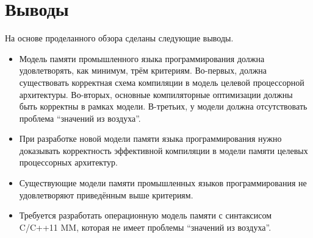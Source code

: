 
\section{Выводы}
На основе проделанного обзора сделаны следующие выводы.
\begin{itemize}
  \item Модель памяти промышленного языка программирования должна удовлетворять, как минимум, трём критериям.
    Во-первых, должна существовать корректная схема компиляции в модель целевой процессорной
    архитектуры.
    Во-вторых, основные компиляторные оптимизации должны быть корректны в рамках модели.
    В-третьих, у модели должна отсутствовать проблема ``значений из воздуха''.
  \item При разработке новой модели памяти языка программирования нужно доказывать корректность эффективной компиляции
     в модели памяти целевых процессорных архитектур.
  \item Существующие модели памяти промышленных языков программирования не удовлетворяют
    приведённым выше критериям.
  \item Требуется разработать операционную модель памяти с синтаксисом C/C++11 MM, которая
    не имеет проблемы ``значений из воздуха''.
\end{itemize}
